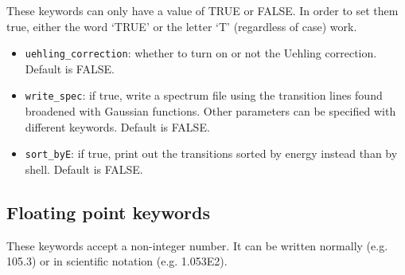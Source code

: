 \documentclass[]{article}
\begin{document}
These keywords can only have a value of TRUE or FALSE. In order to set them true, either the word `TRUE' or the letter `T' (regardless of case) work.

\begin{itemize}
	\item \texttt{uehling\_correction}: whether to turn on or not the Uehling correction. Default is FALSE.
	\item \texttt{write\_spec}: if true, write a spectrum file using the transition lines found broadened with Gaussian functions. Other parameters can be specified with different keywords. Default is FALSE.
	\item \texttt{sort\_byE}: if true, print out the transitions sorted by energy instead than by shell. Default is FALSE.
\end{itemize}

\subsection{Floating point keywords}

These keywords accept a non-integer number. It can be written normally (e.g. 105.3) or in scientific notation (e.g. 1.053E2).
\end{document}
